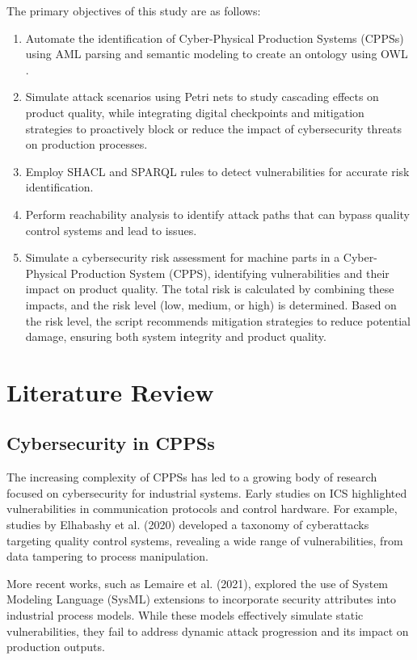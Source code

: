\documentclass[conference]{IEEEtran}
\begin{document}
The primary objectives of this study are as follows:
\begin{enumerate}
    \item Automate the identification of Cyber-Physical Production Systems (CPPSs) using AML parsing and semantic modeling to create an ontology using OWL .
    \item Simulate attack scenarios using Petri nets to study cascading effects on product quality, while integrating digital checkpoints and mitigation strategies to proactively block or reduce the impact of cybersecurity threats on production processes.
    \item Employ SHACL and SPARQL rules to detect vulnerabilities for accurate risk identification.
    \item Perform reachability analysis to identify attack paths that can bypass quality control systems and lead to issues.
    \item Simulate a cybersecurity risk assessment for machine parts in a Cyber-Physical Production System (CPPS), identifying vulnerabilities and their impact on product quality. The total risk is calculated by combining these impacts, and the risk level (low, medium, or high) is determined. Based on the risk level, the script recommends mitigation strategies to reduce potential damage, ensuring both system integrity and product quality.
\end{enumerate}


\section{Literature Review}
\subsection{Cybersecurity in CPPSs}
The increasing complexity of CPPSs has led to a growing body of research focused on cybersecurity for industrial systems. Early studies on ICS highlighted vulnerabilities in communication protocols and control hardware. For example, studies by Elhabashy et al. (2020) developed a taxonomy of cyberattacks targeting quality control systems, revealing a wide range of vulnerabilities, from data tampering to process manipulation.

More recent works, such as Lemaire et al. (2021), explored the use of System Modeling Language (SysML) extensions to incorporate security attributes into industrial process models. While these models effectively simulate static vulnerabilities, they fail to address dynamic attack progression and its impact on production outputs.
\end{document}
